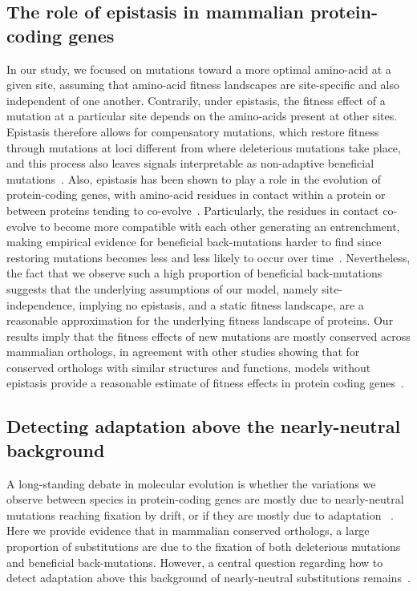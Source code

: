 \documentclass{article}
\begin{document}
    \subsection*{The role of epistasis in mammalian protein-coding genes}

    In our study, we focused on mutations toward a more optimal amino-acid at a given site, assuming that amino-acid fitness landscapes are site-specific and also independent of one another.
    Contrarily, under epistasis, the fitness effect of a mutation at a particular site depends on the amino-acids present at other sites.
    Epistasis therefore allows for compensatory mutations, which restore fitness through mutations at loci different from where deleterious mutations take place, and this process also leaves signals interpretable as non-adaptive beneficial mutations~\cite{hartl_compensatory_1996, pollock_strong_2014, starr_epistasis_2016}.
    Also, epistasis has been shown to play a role in the evolution of protein-coding genes, with amino-acid residues in contact within a protein or between proteins tending to co-evolve~\cite{breen_epistasis_2012, starr_epistasis_2016}.
    Particularly, the residues in contact co-evolve to become more compatible with each other generating an entrenchment, making empirical evidence for beneficial back-mutations harder to find since restoring mutations becomes less and less likely to occur over time~\cite{goldstein_nonadaptive_2015, goldstein_sequence_2017, park_epistatic_2022}.
    Nevertheless, the fact that we observe such a high proportion of beneficial back-mutations suggests that the underlying assumptions of our model, namely site-independence, implying no epistasis, and a static fitness landscape, are a reasonable approximation for the underlying fitness landscape of proteins.
    Our results imply that the fitness effects of new mutations are mostly conserved across mammalian orthologs, in agreement with other studies showing that for conserved orthologs with similar structures and functions, models without epistasis provide a reasonable estimate of fitness effects in protein coding genes~\cite{ashenberg_mutational_2013, youssef_consequences_2020}.

    \subsection*{Detecting adaptation above the nearly-neutral background}

    A long-standing debate in molecular evolution is whether the variations we observe between species in protein-coding genes are mostly due to nearly-neutral mutations reaching fixation by drift, or if they are mostly due to adaptation ~\cite{kimura_evolutionary_1968,kern_neutral_2018,jensen_importance_2019,gillespie_substitution_1994,Ohta1992}.
    Here we provide evidence that in mammalian conserved orthologs, a large proportion of substitutions are due to the fixation of both deleterious mutations and beneficial back-mutations.
    However, a central question regarding how to detect adaptation above this background of nearly-neutral substitutions remains~\cite{kimura_evolutionary_1968,ohta_development_1996}.
\end{document}
